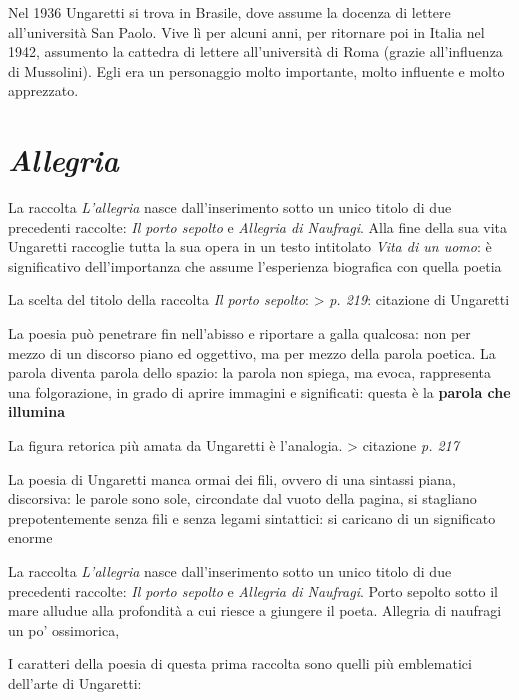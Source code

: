 Nel 1936 Ungaretti si trova in Brasile, dove assume la docenza di lettere all'università San Paolo. Vive lì per alcuni anni, per ritornare poi in Italia nel 1942, assumento la cattedra di lettere all'università di Roma (grazie all'influenza di Mussolini).
Egli era un personaggio molto importante, molto influente e molto apprezzato.

\section{\textit{Allegria}}

La raccolta \textit{L'allegria} nasce dall'inserimento sotto un unico titolo di due precedenti raccolte: \textit{Il porto sepolto} e \textit{Allegria di Naufragi}. Alla fine della sua vita Ungaretti raccoglie tutta la sua opera in un testo intitolato \textit{Vita di un uomo}: è significativo dell'importanza che assume l'esperienza biografica con quella poetia

La scelta del titolo della raccolta \textit{Il porto sepolto}:
> \emph{p. 219}: citazione di Ungaretti

La poesia può penetrare fin nell'abisso e riportare a galla qualcosa: non per mezzo di un discorso piano ed oggettivo, ma per mezzo della parola poetica.
La parola diventa parola dello spazio: la parola non spiega, ma evoca, rappresenta una folgorazione, in grado di aprire immagini e significati: questa è la \textbf{parola che illumina}

La figura retorica più amata da Ungaretti è l'analogia.
> citazione \emph{p. 217}

La poesia di Ungaretti manca ormai dei fili, ovvero di una sintassi piana, discorsiva: le parole sono sole, circondate dal vuoto della pagina, si stagliano prepotentemente senza fili e senza legami sintattici: si caricano di un significato enorme

La raccolta \textit{L'allegria} nasce dall'inserimento sotto un unico titolo di due precedenti raccolte: \textit{Il porto sepolto} e \textit{Allegria di Naufragi}. Porto sepolto sotto il mare alludue alla profondità a cui riesce a giungere il poeta. Allegria di naufragi un po' ossimorica,

I caratteri della poesia di questa prima raccolta sono quelli più emblematici dell'arte di Ungaretti:


